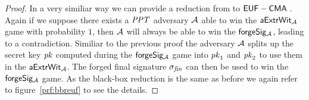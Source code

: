 \begin{proof}
    In a very similiar way we can provide a reduction from \cnstWitnessExtractability to $\mathsf{EUF-CMA\;}$.
    Again if we suppose there exists a $\mathit{PPT}$ adversary $\mathcal{A}$ able to win the $\mathsf{aExtrWit_{\mathcal{A}}}$ game with probability $1$,
    then $\mathcal{A}$ will always be able to win the $\mathsf{forgeSig_{\mathcal{A}}}$, leading to a contradiction. Similiar to the previous proof the adversary $\mathcal{A}$
    splits up the secret key $\mathit{pk}$ computed during the $\mathsf{forgeSig_{\mathcal{A}}}$ game into $\mathit{pk}_1$ and $\mathit{pk}_2$ to use them in the $\mathsf{aExtrWit_{\mathcal{A}}}$.
    The forged final signature $\sigma_{\mathit{fin}}$ can then be used to win the $\mathsf{forgeSig_{\mathcal{A}}}$ game. As the black-box reduction is the same as before we again refer
    to figure~\ref{prf:bbreuf} to see the details.

\end{proof}
